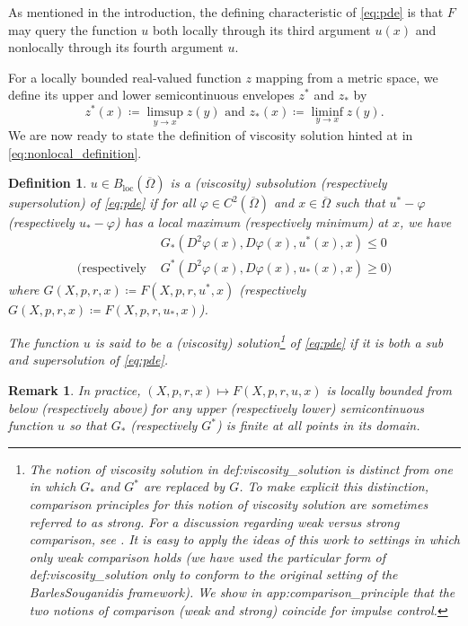 \documentclass[12pt]{article}
\newcounter{dummy}
\newtheorem{definition}[dummy]{Definition}
\newtheorem{rem}[dummy]{Remark}
\begin{document}
As mentioned in the introduction, the defining characteristic of \eqref{eq:pde}
is that $F$ may query the function $u$ both locally through its
third argument $u(x)$ and nonlocally through its fourth argument
$u$.

For a locally bounded real-valued function $z$ mapping from a metric
space, we define its upper and lower semicontinuous envelopes $z^{*}$
and $z_{*}$ by
\[
z^{*}(x)\coloneqq\limsup_{y\rightarrow x}z(y)\text{ and }z_{*}(x)\coloneqq\liminf_{y\rightarrow x}z(y).
\]
We are now ready to state the definition of viscosity solution
hinted at in \eqref{eq:nonlocal_definition}.
\begin{definition}
\label{def:viscosity_solution}$u\in B_{\operatorname{loc}}(\overline{\Omega})$
is a (viscosity) subsolution (respectively supersolution) of \eqref{eq:pde}
if for all $\varphi\in C^{2}(\overline{\Omega})$ and $x\in\overline{\Omega}$
such that $u^{*}-\varphi$ (respectively $u_{*}-\varphi$) has a local
maximum (respectively minimum) at $x$, we have
\begin{align*}
 & G_{*}(D^{2}\varphi(x),D\varphi(x),u^{*}(x),x){\leqslant}0\\
\text{(respectively } & G^{*}(D^{2}\varphi(x),D\varphi(x),u_{*}(x),x){\geqslant}0\text{)}
\end{align*}
where $G(X,p,r,x)\coloneqq F(X,p,r,u^{*},x)$ (respectively $G(X,p,r,x)\coloneqq F(X,p,r,u_{*},x)$).

The function $u$ is said to be a (viscosity) solution\emph{}\footnote{The notion of viscosity solution in {\prettyref}{def:viscosity_solution}
is distinct from one in which $G_{*}$ and $G^{*}$ are replaced by
$G$. To make explicit this distinction, comparison principles for
this notion of viscosity solution are sometimes referred to as \emph{strong}.
For a discussion regarding weak versus strong comparison, see \cite[Remark 3.2]{MR2857450}.
It is easy to apply the ideas of this work to settings in which only
weak comparison holds (we have used the particular form of {\prettyref}{def:viscosity_solution}
only to conform to the original setting of the Barles\textendash Souganidis
framework). We show in {\prettyref}{app:comparison_principle} that
the two notions of comparison (weak and strong) coincide for impulse
control.} of \eqref{eq:pde} if it is both a sub and supersolution of \eqref{eq:pde}.
\end{definition}
\begin{rem}\label{rem:locally_bounded}In practice,
$(X,p,r,x)\mapsto F(X,p,r,u,x)$ is locally bounded from below
(respectively above) for any upper (respectively lower) semicontinuous
function $u$ so that $G_{*}$ (respectively $G^{*}$) is finite at all points in its domain.\end{rem}
\end{document}
